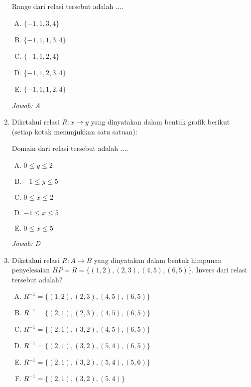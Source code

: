 \documentclass[fleqn, a4paper, 12pt]{article} %
\begin{document}
\begin{enumerate}
			Range dari relasi tersebut adalah ....
			
			\begin{enumerate}[(A)]
				\item $\{-1, 1, 3, 4\}$
				\item $\{-1, 1, 1, 3, 4\}$
				\item $\{-1, 1, 2, 4\}$
				\item $\{-1, 1, 2, 3, 4\}$
				\item $\{-1, 1, 1, 2, 4\}$
			\end{enumerate}
			
			\textit{Jawab: A}
		
		\newpage
		
		\item Diketahui relasi $R:x \rightarrow y$ yang dinyatakan dalam bentuk grafik berikut (setiap kotak menunjukkan satu satuan):	\\
			
			Domain dari relasi tersebut adalah ....
			
			\begin{enumerate}[(A)]
				\item $ 0 \leq y \leq 2$
				\item $ -1 \leq y \leq 5$
				\item $ 0 \leq x \leq 2$
				\item $ -1 \leq x \leq 5$
				\item $ 0 \leq x \leq 5$
			\end{enumerate}
			
			\textit{Jawab: D}
			
		\item Diketahui relasi $R:A \rightarrow B$ yang dinyatakan dalam bentuk himpunan penyelesaian $HP = R = \{(1, 2), (2, 3), (4, 5), (6, 5)\}$. Invers dari relasi tersebut adalah?
		
			\begin{enumerate}[(A)]
				\item $R^{-1} = \{(1, 2), (2, 3), (4, 5), (6, 5)\}$
				\item $R^{-1} = \{(2, 1), (2, 3), (4, 5), (6, 5)\}$
				\item $R^{-1} = \{(2, 1), (3, 2), (4, 5), (6, 5)\}$
				\item $R^{-1} = \{(2, 1), (3, 2), (5, 4), (6, 5)\}$
				\item $R^{-1} = \{(2, 1), (3, 2), (5, 4), (5, 6)\}$
				\item $R^{-1} = \{(2, 1), (3, 2), (5, 4)\}$
			\end{enumerate}
		

\end{enumerate}
\end{document}
